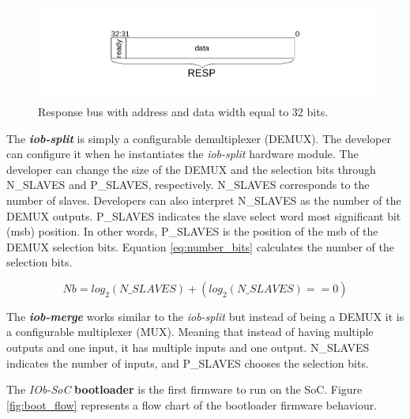 \begin{figure}[!ht]
    \centering
    \includegraphics[width=\linewidth]{../images/resp_bus.pdf}
    \caption{Response bus with address and data width equal to 32 bits.}
    \label{fig:resp_bus}
\end{figure}

The \textbf{\textit{iob-split}} is simply a configurable demultiplexer (DEMUX). The developer can configure it when he instantiates the \textit{iob-split} hardware module. The developer can change the size of the DEMUX and the selection bits through N\_SLAVES and P\_SLAVES, respectively. N\_SLAVES corresponds to the number of slaves. Developers can also interpret N\_SLAVES as the number of the DEMUX outputs. P\_SLAVES indicates the slave select word most significant bit (msb) position. In other words, P\_SLAVES is the position of the msb of the DEMUX selection bits. Equation \ref{eq:number_bits} calculates the number of the selection bits.

\begin{equation}
    \label{eq:number_bits}
    Nb = log_2(N\_SLAVES)+(log_2(N\_SLAVES)==0)
\end{equation}

The \textbf{\textit{iob-merge}} works similar to the \textit{iob-split} but instead of being a DEMUX it is a configurable multiplexer (MUX). Meaning that instead of having multiple outputs and one input, it has multiple inputs and one output. N\_SLAVES indicates the number of inputs, and P\_SLAVES chooses the selection bits.

The \textit{IOb-SoC} \textbf{bootloader} is the first firmware to run on the SoC. Figure \ref{fig:boot_flow} represents a flow chart of the bootloader firmware behaviour.

